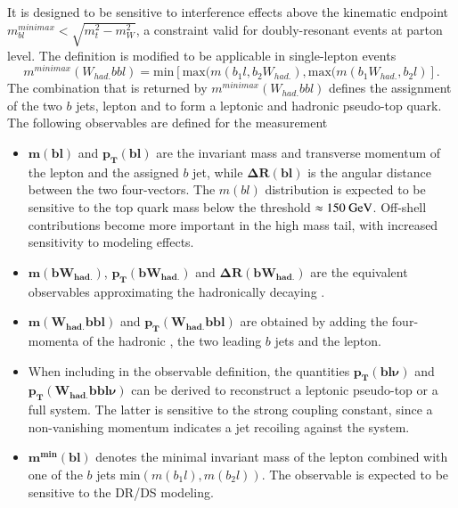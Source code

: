 It is designed to be sensitive to interference effects above the kinematic endpoint
$m^{minimax}_{bl} < \sqrt{m_t^2-m_W^2}$, a constraint valid for doubly-resonant \ttbar events at parton level.
The definition is modified to be applicable in single-lepton events
\begin{equation}
    m^{minimax}(W_{had.}bbl) = \text{min}\left[ \text{max}(m(b_1l, b_2W_{had.}),\text{max}(m(b_1 W_{had.}, b_2 l)\right].
\end{equation}
The combination that is returned by $m^{minimax}(W_{had.}bbl)$ defines the assignment of the two $b$ jets, lepton and \Wboson to form a leptonic and hadronic pseudo-top quark.
The following observables are defined for the measurement
\begin{itemize}
\item \( \bm{ m(bl)} \) and \( \bm{ p_T(bl) } \)
are the invariant mass and transverse momentum of the lepton and the assigned $b$ jet, while \(\bm{ \Delta R(bl)} \)
is the angular distance between the two four-vectors. The $m(bl)$ distribution is expected to be sensitive to the top quark mass below the threshold $\approx 150~\text{GeV}$. Off-shell contributions become more important in the high mass tail,
with increased sensitivity to modeling effects.
\item \( \bm{ m(bW_{had.}) } \), \( \bm{ p_T(bW_{had.}) } \) and \( \bm{ \Delta R(bW_{had.}) } \) are the equivalent observables approximating the hadronically decaying \Wboson.
\item \( \bm{ m(W_{had.}bbl) } \) and \( \bm{ p_T(W_{had.}bbl) } \) are obtained by adding the four-momenta of the hadronic \Wboson, the two leading $b$ jets and the lepton.
\item When including \ETmiss in the observable definition, the quantities \( \bm{ p_T(bl\nu) } \) and
\( \bm{ p_T(W_{had.}bbl\nu) } \) can be derived to reconstruct a leptonic pseudo-top or a full \ttbar system. The latter is sensitive to the strong coupling constant, since a non-vanishing momentum indicates a jet recoiling against the \ttbar system.
\item \( \bm{ m^\text{min}(bl) } \) denotes the minimal invariant mass of the lepton combined with one of the $b$ jets min$(m(b_1l),m(b_2l))$. The observable is expected to be sensitive to the DR/DS modeling.
\end{itemize}

